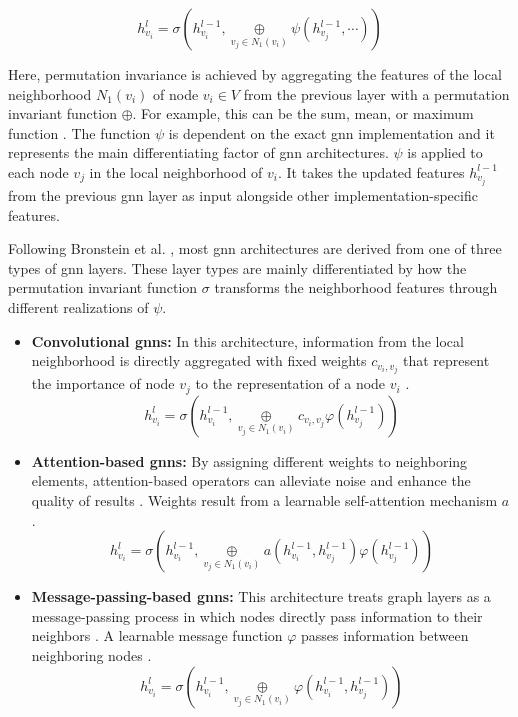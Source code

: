 \begin{equation}
    h_{v_i}^l = \sigma(h_{v_i}^{l-1}, \underset{v_j \in N_1(v_i)}{\oplus} \psi(h_{v_j}^{l-1}, \cdots))
\end{equation}

Here, permutation invariance is achieved by aggregating the features of the local neighborhood $N_1(v_i)$ of node $v_i \in V$ from the previous layer with a permutation invariant function $\oplus$. For example, this can be the sum, mean, or maximum function \cite{bronstein_geometric_2021}. The function $\psi$ is dependent on the exact \gls{gnn} implementation and it represents the main differentiating factor of \gls{gnn} architectures. $\psi$ is applied to each node $v_j$ in the local neighborhood of $v_i$. It takes the updated features $h_{v_j}^{l-1}$ from the previous \gls{gnn} layer as input alongside other implementation-specific features.

Following Bronstein et al. \cite{bronstein_geometric_2021}, most \gls{gnn} architectures are derived from one of three types of \gls{gnn} layers. These layer types are mainly differentiated by how the permutation invariant function $\sigma$ transforms the neighborhood features through different realizations of $\psi$.

\begin{itemize}
    \item \textbf{Convolutional \glspl{gnn}:} In this architecture, information from the local neighborhood is directly aggregated with fixed weights $c_{v_i, v_j}$ that represent the importance of node $v_j$ to the representation of a node $v_i$ \cite{bronstein_geometric_2021, wu_comprehensive_2021}.
    \begin{equation}
        h_{v_i}^l = \sigma(h_{v_i}^{l-1}, \underset{v_j \in N_1(v_i)}{\oplus} c_{v_i, v_j} \varphi(h_{v_j}^{l-1}))
    \end{equation}
    
    \item \textbf{Attention-based \glspl{gnn}:} By assigning different weights to neighboring elements, attention-based operators can alleviate noise and enhance the quality of results \cite{zhou_graph_2020}. Weights result from a learnable self-attention mechanism $a$ \cite{bronstein_geometric_2021}.
    \begin{equation}
        h_{v_i}^l = \sigma(h_{v_i}^{l-1}, \underset{v_j \in N_1(v_i)}{\oplus} a(h_{v_i}^{l-1}, h_{v_j}^{l-1}) \varphi(h_{v_j}^{l-1}))
    \end{equation}

    \item \textbf{Message-passing-based \glspl{gnn}:} This architecture treats graph layers as a message-passing process in which nodes directly pass information to their neighbors \cite{wu_comprehensive_2021}. A learnable message function $\varphi$ passes information between neighboring nodes \cite{bronstein_geometric_2021}.
    \begin{equation}
        h_{v_i}^l = \sigma(h_{v_i}^{l-1}, \underset{v_j \in N_1(v_i)}{\oplus} \varphi(h_{v_i}^{l-1}, h_{v_j}^{l-1}))
    \end{equation}
\end{itemize}

